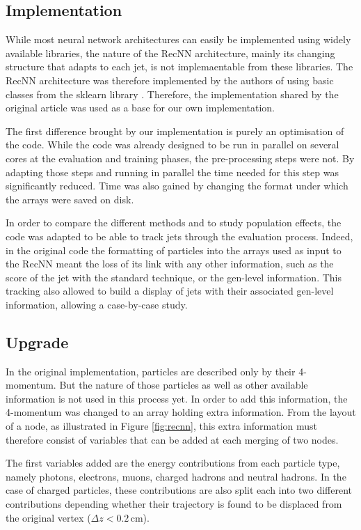 \subsection{Implementation}

While most neural network architectures can easily be implemented using widely available libraries, the nature of the RecNN architecture, mainly its changing structure that adapts to each jet, is not implemaentable from these libraries. The RecNN architecture was therefore implemented by the authors of \cite{Louppe:2017ipp} using basic classes from the sklearn library \cite{scikit-learn}. Therefore, the implementation shared by the original article \cite{Louppe:2017ipp} was used as a base for our own implementation. 

The first difference brought by our implementation is purely an optimisation of the code. While the code was already designed to be run in parallel on several cores at the evaluation and training phases, the pre-processing steps were not. By adapting those steps and running in parallel the time needed for this step was significantly reduced. Time was also gained by changing the format under which the arrays were saved on disk.

In order to compare the different methods and to study population effects, the code was adapted to be able to track jets through the evaluation process. Indeed, in the original code the formatting of particles into the arrays used as input to the RecNN meant the loss of its link with any other information, such as the score of the jet with the standard technique, or the gen-level information. This tracking also allowed to build a display of jets with their associated gen-level information, allowing a case-by-case study.

\subsection{Upgrade}

In the original implementation, particles are described only by their 4-momentum. But the nature of those particles as well as other available information is not used in this process yet. In order to add this information, the 4-momentum was changed to an array holding extra information. From the layout of a node, as illustrated in Figure \ref{fig:recnn}, this extra information must therefore consist of variables that can be added at each merging of two nodes.

The first variables added are the energy contributions from each particle type, namely photons, electrons, muons, charged hadrons and neutral hadrons. In the case of charged particles, these contributions are also split each into two different contributions depending whether their trajectory is found to be displaced from the original vertex ($\Delta z < 0.2\,\mathrm{cm}$). 

